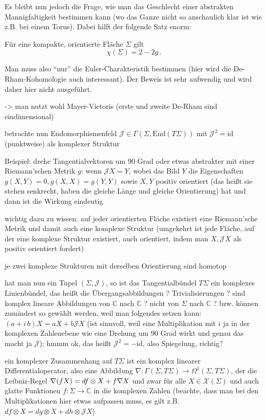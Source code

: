 \documentclass[../H_Analysis_main.tex]{subfiles}
\begin{document}
Es bleibt nun jedoch die Frage, wie man das Geschlecht einer abstrakten Mannigfaltigkeit bestimmen kann (wo das Ganze nicht so anschaulich klar ist wie z.B. bei einem Torus). Dabei hilft der folgende Satz enorm:
\begin{satz}
Für eine kompakte, orientierte Fläche $\Sigma$ gilt
\begin{equation}
\chi(\Sigma) = 2 - 2g \, .
\end{equation}
\end{satz}
Man muss also \enquote{nur} die Euler-Charakteristik bestimmen (hier wird die De-Rham-Kohomologie auch interessant). Der Beweis ist sehr aufwendig und wird daher hier nicht ausgeführt.

-> man nutzt wohl Mayer-Vietoris (erste und zweite De-Rham sind eindimensional)


betrachte nun Endomorphismenfeld $\mathcal{J} \in \Gamma(\Sigma, \text{End}(T\Sigma))$ mit $\mathcal{J}^2 = \text{id}$ (punktweise) als komplexer Struktur


Beispiel: drehe Tangentialvektoren um 90 Grad oder etwas abstrakter mit einer Riemann'schen Metrik $g$: wenn $\mathcal{J}X = Y$, wobei das Bild $Y$ die Eigenschaften $g(X, Y) = 0, g(X, X) = g(Y, Y)$ sowie $X, Y$ positiv orientiert (das heißt sie stehen senkrecht, haben die gleiche Länge und gleiche Orientierung) hat und dann ist die Wirkung eindeutig

wichtig dazu zu wissen: auf jeder orientierten Fläche existiert eine Riemann'sche Metrik und damit auch eine komplexe Struktur (umgekehrt ist jede Fläche, auf der eine komplexe Struktur existiert, auch orientiert, indem man $X, \mathcal{J}X$ als positiv orientiert fordert)

je zwei komplexe Strukturen mit derselben Orientierung sind homotop 


hat man nun ein Tupel $(\Sigma, \mathcal{J})$, so ist das Tangentialbündel $T\Sigma$ ein komplexes Linienbündel, das heißt die Übergangsabbildungen ? Trivialisierungen ? sind komplex lineare Abbildungen von $\mathbb{C}$ nach $\mathbb{C}$ ? nicht von $\Sigma$ nach $\mathbb{C}$ ? bzw. können zumindest so gewählt werden, weil man folgendes setzen kann: $(a + i \, b) X = a X + b \mathcal{J} X$ (ist sinnvoll, weil eine Multiplikation mit $i$ ja in der komplexen Zahlenebene wie eine Drehung um 90 Grad wirkt und genau das macht ja $\mathcal{J}$); hmmm ok, das heißt $\mathcal{J}^2 = - \text{id}$, also Spiegelung, richtig?


ein komplexer Zusammenhang auf $T\Sigma$ ist ein komplex linearer Differentialoperator, also eine Abbildung $\nabla: \Gamma(\Sigma, T\Sigma) \rightarrow \Omega^1(\Sigma, T\Sigma)$, der die Leibniz-Regel $\nabla\qty(f X) = df \otimes X + f \nabla X$ und zwar für alle $X \in \mathcal{X}(\Sigma)$ und auch glatte Funktionen $f: \Sigma \rightarrow \mathbb{C}$ in die komplexen Zahlen (beachte, dass man bei den Multiplikationen hier etwas aufpassen muss, es gilt z.B. $df \otimes X = dg \otimes X + dh \otimes \mathcal{J} X$)
\end{document}
